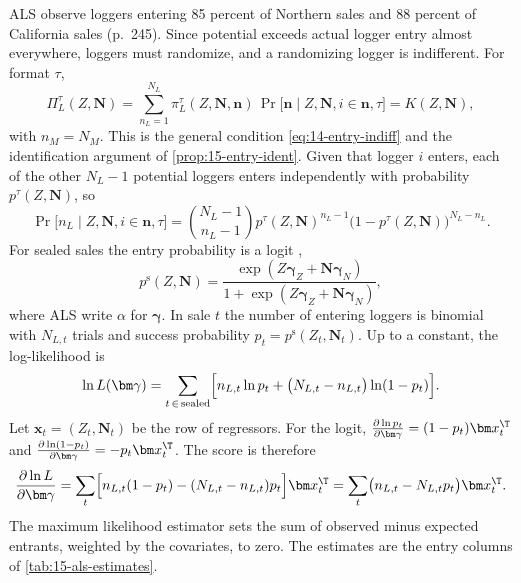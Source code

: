 ALS observe loggers entering 85 percent of Northern sales and 88 percent of California sales (p.~245).
Since potential exceeds actual logger entry almost everywhere, loggers must randomize, and a randomizing
logger is indifferent. For format $\tau$, \citep[eq.~(11)]{AtheyLevinSeira2011}
\begin{equation}\label{eq:15-als-indiff}
\Pi^\tau_L(Z,\bm N)=\sum_{n_L=1}^{N_L}\pi^\tau_L(Z,\bm N,\bm n)\,\Pr\bigl[\bm n\mid Z,\bm N,i\in\bm n,\tau\bigr]=K(Z,\bm N),
\end{equation}
with $n_M=N_M$. This is the general condition \eqref{eq:14-entry-indiff} and the identification argument of
\cref{prop:15-entry-ident}. Given that logger $i$ enters, each of the other $N_L-1$ potential loggers enters
independently with probability $p^\tau(Z,\bm N)$, so \citep[eq.~(12)]{AtheyLevinSeira2011}
\begin{equation}\label{eq:15-als-binom}
\Pr\bigl[n_L\mid Z,\bm N,i\in\bm n,\tau\bigr]=\binom{N_L-1}{n_L-1}p^\tau(Z,\bm N)^{n_L-1}\bigl(1-p^\tau(Z,\bm N)\bigr)^{N_L-n_L}.
\end{equation}
For sealed sales the entry probability is a logit \citep[eq.~(13)]{AtheyLevinSeira2011},
\begin{equation}\label{eq:15-als-logit}
p^{\mathrm s}(Z,\bm N)=\frac{\exp(Z\bm\gamma_Z+\bm N\bm\gamma_N)}{1+\exp(Z\bm\gamma_Z+\bm N\bm\gamma_N)},
\end{equation}
where ALS write $\alpha$ for $\bm\gamma$. In sale $t$ the number of entering loggers is binomial with
$N_{L,t}$ trials and success probability $p_t=p^{\mathrm s}(Z_t,\bm N_t)$. Up to a constant, the
log-likelihood is
\begin{equation}\label{eq:15-als-loglik}
\ln L(\bm\gamma)=\sum_{t\,\in\,\text{sealed}}\Bigl[n_{L,t}\ln p_t+\bigl(N_{L,t}-n_{L,t}\bigr)\ln(1-p_t)\Bigr].
\end{equation}
Let $\bm x_t=(Z_t,\bm N_t)$ be the row of regressors. For the logit, $\frac{\partial\ln p_t}{\partial\bm\gamma}=(1-p_t)\bm x_t^\T$ and
$\frac{\partial\ln(1-p_t)}{\partial\bm\gamma}=-p_t\bm x_t^\T$. The score is therefore
\[
\frac{\partial\ln L}{\partial\bm\gamma}=\sum_t\Bigl[n_{L,t}(1-p_t)-(N_{L,t}-n_{L,t})p_t\Bigr]\bm x_t^\T=\sum_t\bigl(n_{L,t}-N_{L,t}p_t\bigr)\bm x_t^\T .
\]
The maximum likelihood estimator sets the sum of observed minus expected entrants, weighted by the
covariates, to zero. The estimates are the entry columns of \cref{tab:15-als-estimates}.

